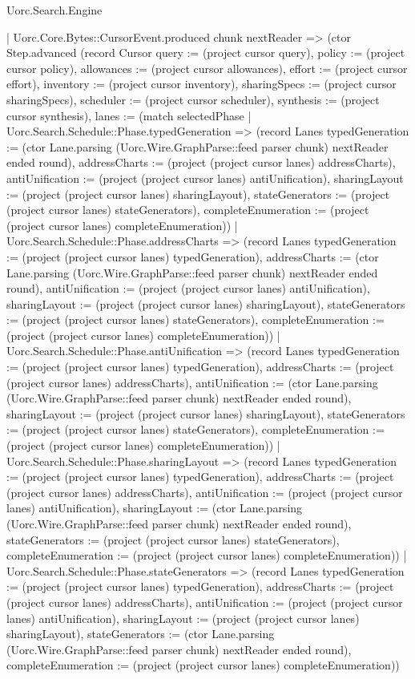 \begin{lexlean}{Uorc.Search.Engine}
\begin{semanticmodule}
{          | Uorc.Core.Bytes::CursorEvent.produced chunk nextReader => (ctor Step.advanced (record Cursor {query := (project cursor query), policy := (project cursor policy), allowances := (project cursor allowances), effort := (project cursor effort), inventory := (project cursor inventory), sharingSpecs := (project cursor sharingSpecs), scheduler := (project cursor scheduler), synthesis := (project cursor synthesis), lanes := (match selectedPhase
            | Uorc.Search.Schedule::Phase.typedGeneration => (record Lanes {typedGeneration := (ctor Lane.parsing (Uorc.Wire.GraphParse::feed parser chunk) nextReader ended round), addressCharts := (project (project cursor lanes) addressCharts), antiUnification := (project (project cursor lanes) antiUnification), sharingLayout := (project (project cursor lanes) sharingLayout), stateGenerators := (project (project cursor lanes) stateGenerators), completeEnumeration := (project (project cursor lanes) completeEnumeration)})
            | Uorc.Search.Schedule::Phase.addressCharts => (record Lanes {typedGeneration := (project (project cursor lanes) typedGeneration), addressCharts := (ctor Lane.parsing (Uorc.Wire.GraphParse::feed parser chunk) nextReader ended round), antiUnification := (project (project cursor lanes) antiUnification), sharingLayout := (project (project cursor lanes) sharingLayout), stateGenerators := (project (project cursor lanes) stateGenerators), completeEnumeration := (project (project cursor lanes) completeEnumeration)})
            | Uorc.Search.Schedule::Phase.antiUnification => (record Lanes {typedGeneration := (project (project cursor lanes) typedGeneration), addressCharts := (project (project cursor lanes) addressCharts), antiUnification := (ctor Lane.parsing (Uorc.Wire.GraphParse::feed parser chunk) nextReader ended round), sharingLayout := (project (project cursor lanes) sharingLayout), stateGenerators := (project (project cursor lanes) stateGenerators), completeEnumeration := (project (project cursor lanes) completeEnumeration)})
            | Uorc.Search.Schedule::Phase.sharingLayout => (record Lanes {typedGeneration := (project (project cursor lanes) typedGeneration), addressCharts := (project (project cursor lanes) addressCharts), antiUnification := (project (project cursor lanes) antiUnification), sharingLayout := (ctor Lane.parsing (Uorc.Wire.GraphParse::feed parser chunk) nextReader ended round), stateGenerators := (project (project cursor lanes) stateGenerators), completeEnumeration := (project (project cursor lanes) completeEnumeration)})
            | Uorc.Search.Schedule::Phase.stateGenerators => (record Lanes {typedGeneration := (project (project cursor lanes) typedGeneration), addressCharts := (project (project cursor lanes) addressCharts), antiUnification := (project (project cursor lanes) antiUnification), sharingLayout := (project (project cursor lanes) sharingLayout), stateGenerators := (ctor Lane.parsing (Uorc.Wire.GraphParse::feed parser chunk) nextReader ended round), completeEnumeration := (project (project cursor lanes) completeEnumeration)})
}}
\end{semanticmodule}
\end{lexlean}
